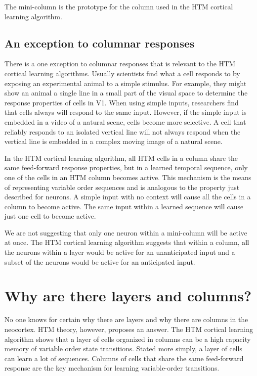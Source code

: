 \documentclass{report}
\begin{document}
The mini-column is the prototype for the column used in the HTM
cortical learning algorithm.

\subsection*{An exception to columnar responses}
There is a one exception to columnar responses that is relevant to the
HTM cortical learning algorithms. Usually scientists find what a cell
responds to by exposing an experimental animal to a simple
stimulus. For example, they might show an animal a single line in a
small part of the visual space to determine the response properties of
cells in V1. When using simple inputs, researchers find that cells
always will respond to the same input. However, if the simple input is
embedded in a video of a natural scene, cells become more selective. A
cell that reliably responds to an isolated vertical line will not
always respond when the vertical line is embedded in a complex moving
image of a natural scene.

In the HTM cortical learning algorithm, all HTM cells in a column
share the same feed-forward response properties, but in a learned
temporal sequence, only one of the cells in an HTM column becomes
active. This mechanism is the means of representing variable order
sequences and is analogous to the property just described for
neurons. A simple input with no context will cause all the cells in a
column to become active. The same input within a learned sequence will
cause just one cell to become active.

We are not suggesting that only one neuron within a mini-column will
be active at once. The HTM cortical learning algorithm suggests that
within a column, all the neurons within a layer would be active for an
unanticipated input and a subset of the neurons would be active for an
anticipated input.

\section*{Why are there layers and columns?}

No one knows for certain why there are layers and why there are
columns in the neocortex. HTM theory, however, proposes an answer. The
HTM cortical learning algorithm shows that a layer of cells organized
in columns can be a high capacity memory of variable order state
transitions. Stated more simply, a layer of cells can learn a lot of
sequences. Columns of cells that share the same feed-forward response
are the key mechanism for learning variable-order transitions.
\end{document}
